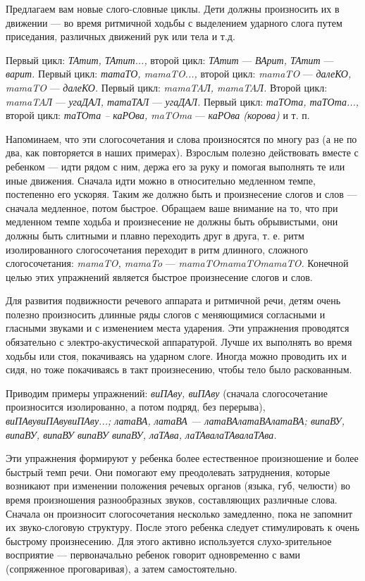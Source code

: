 \documentclass[a5paper]{book}
\renewcommand{\emph}[1]{\textit{#1}}
\begin{document}
Предлагаем вам новые слого-словные циклы. Дети должны произносить их в
движении --- во время ритмичной ходьбы с выделением ударного слога путем
приседания, различных движений рук или тела и т.д.

Первый цикл: \emph{ТАтит, ТАтит...,} второй цикл: \emph{ТАтит} ---
\emph{ВАрит, ТАтит} --- \emph{варит.} Первый цикл: \emph{татаТО,
mamaTO...,} второй цикл: \emph{mamaTO} --- \emph{далеКО, mamaTO} ---
\emph{далеКО.} Первый цикл: \emph{mamaTAЛ, mamaTAЛ.} Второй цикл:
\emph{mamaTAЛ} --- \emph{угаДАЛ, татаТАЛ} --- \emph{угаДАЛ.} Первый
цикл: \emph{таТОта, таТОта...,} второй цикл: \emph{таТОта -- каРОва,
maTOma} --- \emph{каРОва (корова)} и т. п.

Напоминаем, что эти слогосочетания и слова произносятся по многу раз (а
не по два, как повторяется в наших примерах). Взрослым полезно
действовать вместе с ребенком --- идти рядом с ним, держа его за руку и
помогая выполнять те или иные движения. Сначала идти можно в
относительно медленном темпе, постепенно его ускоряя. Таким же должно
быть и произнесение слогов и слов --- сначала медленное, потом быстрое.
Обращаем ваше внимание на то, что при медленном темпе ходьба и
произнесение не должны быть обрывистыми, они должны быть слитными и
плавно переходить друг в друга, т. е. ритм изолированного слогосочетания
переходит в ритм длинного, сложного слогосочетания: \emph{mamaTO,
mamaTo} --- \emph{mamaTOmamaTOmamaTO.} Конечной целью этих упражнений
является быстрое произнесение слогов и слов.

Для развития подвижности речевого аппарата и ритмичной речи, детям очень
полезно произносить длинные ряды слогов с меняющимися согласными и
гласными звуками и с изменением места ударения. Эти упражнения
проводятся обязательно с электро-акустической аппаратурой. Лучше их
выполнять во время ходьбы или стоя, покачиваясь на ударном слоге. Иногда
можно проводить их и сидя, но тоже покачиваясь в такт произнесению,
чтобы тело было раскованным.

Приводим примеры упражнений: \emph{виПАву, виПАву} (сначала
слогосочетание произносится изолированно, а потом подряд, без перерыва),
\emph{виПАвувиПАвувиПАву...; латаВА, латаВА --- латаВАлатаВАлатаВА;
випаВУ, випаВУ, випаВУ випаВУ випаВУ, лаТАва, лаТАвалаТАвалаТАва.}

Эти упражнения формируют у ребенка более естественное произношение и
более быстрый темп речи. Они помогают ему преодолевать затруднения,
которые возникают при изменении положения речевых органов (языка, губ,
челюсти) во время произношения разнообразных звуков, составляющих
различные слова. Сначала он произносит слогосочетания несколько
замедленно, пока не запомнит их звуко-слоговую структуру. После этого
ребенка следует стимулировать к очень быстрому произнесению. Для этого
активно используется слухо-зрительное восприятие --- первоначально
ребенок говорит одновременно с вами (сопряженное проговаривая), а затем
самостоятельно.
\end{document}
